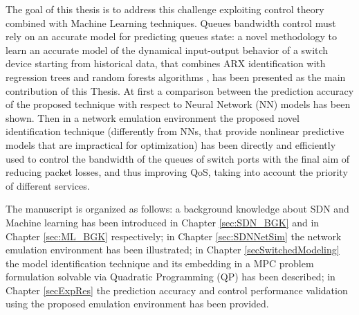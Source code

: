 The goal of this thesis is to address this challenge exploiting control theory combined with Machine Learning techniques. Queues bandwidth control must rely on an accurate model for predicting queues state: a novel methodology to learn an accurate model of the dynamical input-output behavior of a switch device starting from historical data, that combines ARX identification with regression trees and random forests algorithms \cite{Carner2017, Jain2016, Pasquini2017}, has been presented as the main contribution of this Thesis. At first a comparison between the prediction accuracy of the proposed technique with respect to Neural Network (NN) models has been shown. Then in a network emulation environment the proposed novel identification technique (differently from NNs, that provide nonlinear predictive models that are impractical for optimization) has been directly and efficiently used to control the bandwidth of the queues of switch ports with the final aim of reducing packet losses, and thus improving QoS, taking into account the priority of different services.

The manuscript is organized as follows: a background knowledge about SDN and Machine learning has been introduced in Chapter \ref{sec:SDN_BGK} and in Chapter \ref{sec:ML_BGK} respectively; in Chapter \ref{sec:SDNNetSim} the network emulation environment has been illustrated; in Chapter \ref{secSwitchedModeling} the model identification technique and its embedding in a MPC problem formulation solvable via Quadratic Programming (QP) has been described; in Chapter \ref{secExpRes} the prediction accuracy and control performance validation using the proposed emulation environment has been provided.



